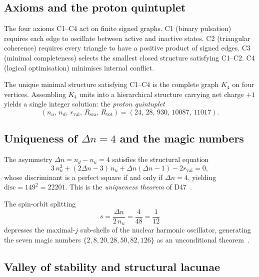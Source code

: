 \documentclass[11pt,a4paper]{article}
\theoremstyle{definition}
\theoremstyle{remark}
\begin{document}
\subsection{Axioms and the proton quintuplet}

The four axioms C1--C4 act on finite signed graphs. C1 (binary pulsation) requires each edge to oscillate between active and inactive states. C2 (triangular coherence) requires every triangle to have a positive product of signed edges. C3 (minimal completeness) selects the smallest closed structure satisfying C1--C2. C4 (logical optimisation) minimises internal conflict.

The unique minimal structure satisfying C1--C4 is the complete graph $K_4$ on four vertices. Assembling $K_4$ units into a hierarchical structure carrying net charge $+1$ yields a single integer solution: the \emph{proton quintuplet}
\begin{equation}
  (n_u,\, n_d,\, r_{\mathrm{val}},\, R_{\mathrm{sea}},\, R_{\mathrm{tot}})
  = (24,\, 28,\, 930,\, 10087,\, 11017).
  \label{eq:quintuplet}
\end{equation}

\subsection{Uniqueness of \texorpdfstring{$\Delta n = 4$}{Delta n = 4} and the magic numbers}

The asymmetry $\Delta n = n_d - n_u = 4$ satisfies the structural equation
\begin{equation}
  3\,n_u^2 + (2\Delta n - 3)\,n_u + \Delta n(\Delta n - 1) - 2 r_{\mathrm{val}} = 0,
  \label{eq:struct}
\end{equation}
whose discriminant is a perfect square if and only if $\Delta n = 4$, yielding $\mathrm{disc} = 149^2 = 22201$. This is the \emph{uniqueness theorem} of D47~\cite{Laubscher_D47_2025}.

The spin-orbit splitting
\begin{equation}
  s = \frac{\Delta n}{2\,n_u} = \frac{4}{48} = \frac{1}{12}
  \label{eq:splitting}
\end{equation}
depresses the maximal-$j$ sub-shells of the nuclear harmonic oscillator, generating the seven magic numbers $\{2,8,20,28,50,82,126\}$ as an unconditional theorem~\cite{Laubscher_D47_2025}.

\subsection{Valley of stability and structural lacunae}
\end{document}
